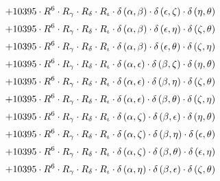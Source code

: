 \begin{subequations}
\begin{gather}
 \\[0.2em] \notag 		 + 10395 \cdot R^{6} \cdot R_{\gamma{}} \cdot R_{\delta{}} \cdot R_{\iota{}} \cdot \delta{}\left(\alpha{}, \beta{}\right) \cdot \delta{}\left(\epsilon{}, \zeta{}\right) \cdot \delta{}\left(\eta{}, \theta{}\right) 
 \\[0.2em] \notag 		 + 10395 \cdot R^{6} \cdot R_{\gamma{}} \cdot R_{\delta{}} \cdot R_{\iota{}} \cdot \delta{}\left(\alpha{}, \beta{}\right) \cdot \delta{}\left(\epsilon{}, \eta{}\right) \cdot \delta{}\left(\zeta{}, \theta{}\right) 
 \\[0.2em] \notag 		 + 10395 \cdot R^{6} \cdot R_{\gamma{}} \cdot R_{\delta{}} \cdot R_{\iota{}} \cdot \delta{}\left(\alpha{}, \beta{}\right) \cdot \delta{}\left(\epsilon{}, \theta{}\right) \cdot \delta{}\left(\zeta{}, \eta{}\right) 
 \\[0.2em] \notag 		 + 10395 \cdot R^{6} \cdot R_{\gamma{}} \cdot R_{\delta{}} \cdot R_{\iota{}} \cdot \delta{}\left(\alpha{}, \epsilon{}\right) \cdot \delta{}\left(\beta{}, \zeta{}\right) \cdot \delta{}\left(\eta{}, \theta{}\right) 
 \\[0.2em] \notag 		 + 10395 \cdot R^{6} \cdot R_{\gamma{}} \cdot R_{\delta{}} \cdot R_{\iota{}} \cdot \delta{}\left(\alpha{}, \epsilon{}\right) \cdot \delta{}\left(\beta{}, \eta{}\right) \cdot \delta{}\left(\zeta{}, \theta{}\right) 
 \\[0.2em] \notag 		 + 10395 \cdot R^{6} \cdot R_{\gamma{}} \cdot R_{\delta{}} \cdot R_{\iota{}} \cdot \delta{}\left(\alpha{}, \epsilon{}\right) \cdot \delta{}\left(\beta{}, \theta{}\right) \cdot \delta{}\left(\zeta{}, \eta{}\right) 
 \\[0.2em] \notag 		 + 10395 \cdot R^{6} \cdot R_{\gamma{}} \cdot R_{\delta{}} \cdot R_{\iota{}} \cdot \delta{}\left(\alpha{}, \zeta{}\right) \cdot \delta{}\left(\beta{}, \epsilon{}\right) \cdot \delta{}\left(\eta{}, \theta{}\right) 
 \\[0.2em] \notag 		 + 10395 \cdot R^{6} \cdot R_{\gamma{}} \cdot R_{\delta{}} \cdot R_{\iota{}} \cdot \delta{}\left(\alpha{}, \zeta{}\right) \cdot \delta{}\left(\beta{}, \eta{}\right) \cdot \delta{}\left(\epsilon{}, \theta{}\right) 
 \\[0.2em] \notag 		 + 10395 \cdot R^{6} \cdot R_{\gamma{}} \cdot R_{\delta{}} \cdot R_{\iota{}} \cdot \delta{}\left(\alpha{}, \zeta{}\right) \cdot \delta{}\left(\beta{}, \theta{}\right) \cdot \delta{}\left(\epsilon{}, \eta{}\right) 
 \\[0.2em] \notag 		 + 10395 \cdot R^{6} \cdot R_{\gamma{}} \cdot R_{\delta{}} \cdot R_{\iota{}} \cdot \delta{}\left(\alpha{}, \eta{}\right) \cdot \delta{}\left(\beta{}, \epsilon{}\right) \cdot \delta{}\left(\zeta{}, \theta{}\right) 

\end{gather}
\end{subequations}
